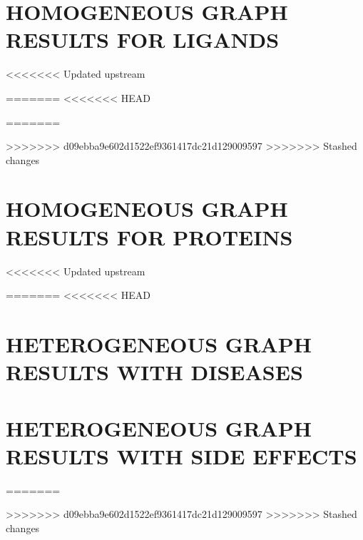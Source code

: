 \chapter{HOMOGENEOUS GRAPH RESULTS FOR LIGANDS}
\label{app:homogeneous_ligand}

<<<<<<< Updated upstream


=======
<<<<<<< HEAD
\newpage

\newpage

\newpage
=======


>>>>>>> d09ebba9e602d1522ef9361417dc21d129009597
>>>>>>> Stashed changes


\chapter{HOMOGENEOUS GRAPH RESULTS FOR PROTEINS}
\label{app:homogeneous_protein}

<<<<<<< Updated upstream



=======
<<<<<<< HEAD
\newpage

\newpage

\newpage


\chapter{HETEROGENEOUS GRAPH RESULTS WITH DISEASES}
\label{app:heterogeneous_disease}

\newpage

\newpage

\newpage

\newpage

\newpage


\chapter{HETEROGENEOUS GRAPH RESULTS WITH SIDE EFFECTS}
\label{app:heterogeneous_side_effects}

\newpage

\newpage

\newpage

=======



>>>>>>> d09ebba9e602d1522ef9361417dc21d129009597
>>>>>>> Stashed changes
